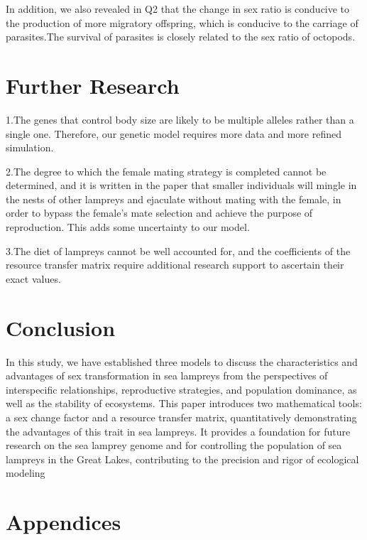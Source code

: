 \documentclass[12pt]{article}
\begin{document}
In addition, we also revealed in Q2 that the change in sex ratio is conducive to the production
of more migratory offspring, which is conducive to the carriage of parasites.The survival of
parasites is closely related to the sex ratio of octopods.

\section{Further Research}

1.The genes that control body size are likely to be multiple alleles rather than a single one.
Therefore, our genetic model requires more data and more refined simulation.

2.The degree to which the female mating strategy is completed cannot be determined, and it is 
written in the paper\cite{docker_lampreys_2015} that smaller individuals will mingle in the nests of other lampreys 
and ejaculate without mating with the female, in order to bypass the female's mate selection and 
achieve the purpose of reproduction. This adds some uncertainty to our model.

3.The diet of lampreys cannot be well accounted for, and the coefficients of the resource transfer
 matrix require additional research support to ascertain their exact values.

\section{Conclusion}

In this study, we have established three models to discuss the characteristics and advantages of sex transformation in sea lampreys from the perspectives of interspecific relationships, reproductive strategies, and population dominance, as well as the stability of ecosystems. This paper introduces two mathematical tools: a sex change factor and a resource transfer matrix, quantitatively demonstrating the advantages of this trait in sea lampreys. It provides a foundation for future research on the sea lamprey genome and for controlling the population of sea lampreys in the Great Lakes, contributing to the precision and rigor of ecological modeling 

\newpage
\newpage
\listoffigures
\listoftables


\newpage
\section*{Appendices}
\end{document}
